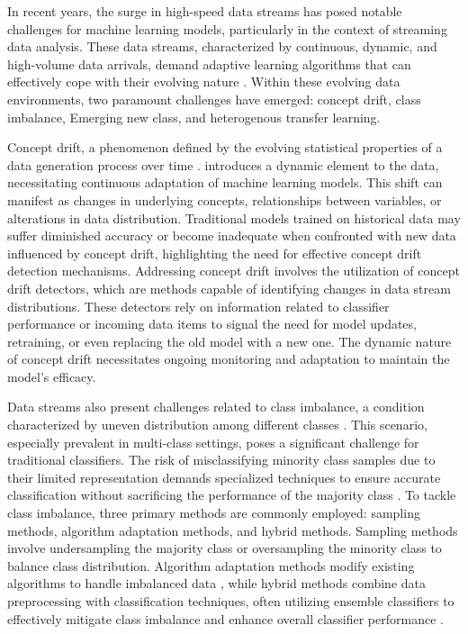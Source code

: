 In recent years, the surge in high-speed data streams has posed notable challenges for machine learning models, particularly in the context of streaming data analysis. These data streams, characterized by continuous, dynamic, and high-volume data arrivals, demand adaptive learning algorithms that can effectively cope with their evolving nature \cite{yang2021concept, dong2019multistream, shan2018online}. Within these evolving data environments, two paramount challenges have emerged: concept drift, class imbalance, Emerging new class, and heterogenous transfer learning.

Concept drift, a phenomenon defined by the evolving statistical properties of a data generation process over time \cite{pan2009survey, zhuang2020comprehensive}. introduces a dynamic element to the data, necessitating continuous adaptation of machine learning models. This shift can manifest as changes in underlying concepts, relationships between variables, or alterations in data distribution. Traditional models trained on historical data may suffer diminished accuracy or become inadequate when confronted with new data influenced by concept drift, highlighting the need for effective concept drift detection mechanisms. Addressing concept drift involves the utilization of concept drift detectors, which are methods capable of identifying changes in data stream distributions. These detectors rely on information related to classifier performance or incoming data items to signal the need for model updates, retraining, or even replacing the old model with a new one. The dynamic nature of concept drift necessitates ongoing monitoring and adaptation to maintain the model's efficacy.

Data streams also present challenges related to class imbalance, a condition characterized by uneven distribution among different classes \cite{wang2018systematic, sun2009classification}. This scenario, especially prevalent in multi-class settings, poses a significant challenge for traditional classifiers. The risk of misclassifying minority class samples due to their limited representation demands specialized techniques to ensure accurate classification without sacrificing the performance of the majority class \cite{charte2015addressing, charte2015mlsmote, daniels2017addressing, liu2018making}. To tackle class imbalance, three primary methods are commonly employed: sampling methods, algorithm adaptation methods, and hybrid methods. Sampling methods involve undersampling the majority class or oversampling the minority class to balance class distribution. Algorithm adaptation methods modify existing algorithms to handle imbalanced data \cite{japkowicz1995novelty, lopez2012analysis, zhang2020towards}, while hybrid methods combine data preprocessing with classification techniques, often utilizing ensemble classifiers to effectively mitigate class imbalance and enhance overall classifier performance \cite{chawla2003smoteboost, wang2010negative, galar2011review, cruz2018dynamic}.

